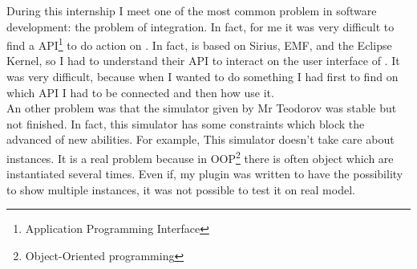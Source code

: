 During this internship I meet one of the most common problem in software development: the problem of integration. In fact, for me it was very difficult to find a API\footnote{Application Programming Interface} to do action on \umld. In fact, \umld is based on Sirius, EMF, and the Eclipse Kernel, so I had to understand their API to interact on the user interface of \umld. It was very difficult, because when I wanted to do something I had first to find on which API I had to be connected and then how use it.
~\\

An other problem was that the simulator given by Mr Teodorov was stable but not finished. In fact, this simulator has some constraints which block the advanced of new abilities. For example, This simulator doesn't take care about instances. It is a real problem because in OOP\footnote{Object-Oriented programming} there is often object which are instantiated several times. Even if, my plugin was written to have the possibility to show multiple instances, it was not possible to test it on real model.



